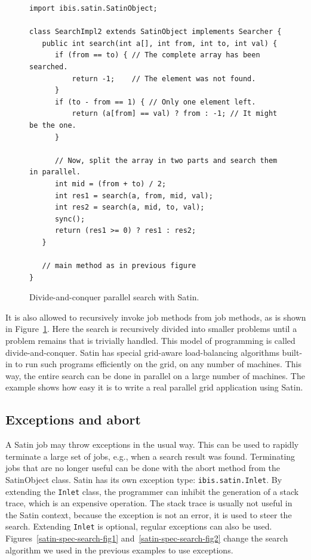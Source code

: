 \documentclass[10pt]{article}
\newcommand{\mysubsection}[1]{\subsection{#1}\label{#1}}
\begin{document}
\begin{figure}[t!]
{\small
\begin{verbatim}
import ibis.satin.SatinObject;

class SearchImpl2 extends SatinObject implements Searcher {
   public int search(int a[], int from, int to, int val) {
      if (from == to) { // The complete array has been searched.
          return -1;    // The element was not found.
      }
      if (to - from == 1) { // Only one element left.
          return (a[from] == val) ? from : -1; // It might be the one.
      }

      // Now, split the array in two parts and search them in parallel.
      int mid = (from + to) / 2;
      int res1 = search(a, from, mid, val);
      int res2 = search(a, mid, to, val);
      sync();
      return (res1 >= 0) ? res1 : res2;
   }

   // main method as in previous figure
}
\end{verbatim}
}
\caption{Divide-and-conquer parallel search with Satin.}
\label{satin-par-search-fig}
\end{figure}

It is also allowed to recursively invoke job methods from job methods,
as is shown in Figure~\ref{satin-par-search-fig}. Here the search is recursively divided into
smaller problems until a problem remains that is trivially
handled. This model of programming is called divide-and-conquer. Satin
has special grid-aware load-balancing algorithms built-in to run such
programs efficiently on the grid, on any number of machines. This way,
the entire search can be done in parallel on a large number of
machines. The example shows how easy it is to write a real parallel
grid application using Satin.  

\mysubsection{Exceptions and abort}

A Satin job may
throw exceptions in the usual way. This can be used to rapidly
terminate a large set of jobs, e.g., when a search result was
found. Terminating jobs that are no longer useful can be done with the
abort method from the SatinObject class.  Satin has its own exception
type: \texttt{ibis.satin.Inlet}.  By extending the \texttt{Inlet} class,
the programmer can inhibit the generation of a stack trace,
which is an expensive operation.
The stack trace is usually not useful in the Satin context,
because the exception is not an error, it is used to steer the
search. Extending \texttt{Inlet} is optional, regular exceptions can also be
used. Figures~\ref{satin-spec-search-fig1} and~\ref{satin-spec-search-fig2} change the search algorithm we used in the previous
examples to use exceptions.
\end{document}
